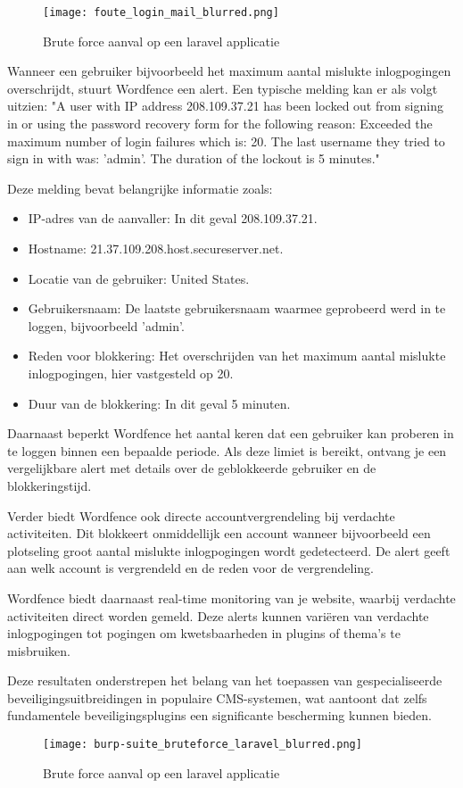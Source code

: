 \begin{figure}
    \centering
    \texttt{[image: foute\_login\_mail\_blurred.png]}
    \caption[Brute force aanval op een laravel applicatie]{Brute force aanval op een laravel applicatie}
\end{figure}
Wanneer een gebruiker bijvoorbeeld het maximum aantal mislukte inlogpogingen overschrijdt, stuurt Wordfence een alert. 
Een typische melding kan er als volgt uitzien: "A user with IP address 208.109.37.21 has been locked out from signing in or 
using the password recovery form for the following reason: Exceeded the maximum number of login failures which is: 20. The 
last username they tried to sign in with was: 'admin'. The duration of the lockout is 5 minutes."

Deze melding bevat belangrijke informatie zoals:
\begin{itemize}
    \item IP-adres van de aanvaller: In dit geval 208.109.37.21.
    \item Hostname: 21.37.109.208.host.secureserver.net.
    \item Locatie van de gebruiker: United States.
    \item Gebruikersnaam: De laatste gebruikersnaam waarmee geprobeerd werd in te loggen, bijvoorbeeld 'admin'.
    \item Reden voor blokkering: Het overschrijden van het maximum aantal mislukte inlogpogingen, hier vastgesteld op 20.
    \item Duur van de blokkering: In dit geval 5 minuten.
\end{itemize}
Daarnaast beperkt Wordfence het aantal keren dat een gebruiker kan proberen in te loggen binnen een bepaalde periode. 
Als deze limiet is bereikt, ontvang je een vergelijkbare alert met details over de geblokkeerde gebruiker en de 
blokkeringstijd.

Verder biedt Wordfence ook directe accountvergrendeling bij verdachte activiteiten. Dit blokkeert onmiddellijk een 
account wanneer bijvoorbeeld een plotseling groot aantal mislukte inlogpogingen wordt gedetecteerd. De alert geeft 
aan welk account is vergrendeld en de reden voor de vergrendeling.

Wordfence biedt daarnaast real-time monitoring van je website, waarbij verdachte activiteiten direct worden gemeld. 
Deze alerts kunnen variëren van verdachte inlogpogingen tot pogingen om kwetsbaarheden in plugins of thema's te misbruiken.

Deze resultaten onderstrepen het belang van het toepassen van gespecialiseerde beveiligingsuitbreidingen in populaire 
CMS-systemen, wat aantoont dat zelfs fundamentele beveiligingsplugins een significante bescherming kunnen bieden.
\begin{figure}
    \centering
    \texttt{[image: burp-suite\_bruteforce\_laravel\_blurred.png]}
    \caption[Brute force aanval op een laravel applicatie]{Brute force aanval op een laravel applicatie}
\end{figure}
